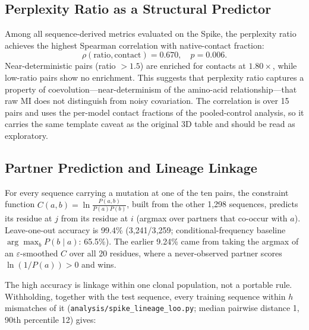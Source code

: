\subsection{Perplexity Ratio as a Structural Predictor}
Among all sequence-derived metrics evaluated on the Spike, the perplexity
ratio achieves the highest Spearman correlation with native-contact fraction:
\begin{equation}
	\rho(\text{ratio}, \text{contact}) = 0.670, \quad p = 0.006.
\end{equation}
Near-deterministic pairs (ratio $> 1.5$) are enriched for contacts at
$1.80\times$, while low-ratio pairs show no enrichment.  This suggests that
perplexity ratio captures a property of coevolution---near-determinism of the
amino-acid relationship---that raw MI does not distinguish from noisy
covariation.  The correlation is over 15 pairs and uses the per-model contact
fractions of the pooled-control analysis, so it carries the same template
caveat as the original 3D table and should be read as exploratory.

\subsection{Partner Prediction and Lineage Linkage}
For every sequence carrying a mutation at one of the ten pairs, the
constraint function $C(a,b) = \ln\frac{P(a,b)}{P(a)P(b)}$, built from the
other 1{,}298 sequences, predicts its residue at $j$ from its residue at $i$
(argmax over partners that co-occur with $a$).  Leave-one-out accuracy is
99.4\% (3{,}241/3{,}259; conditional-frequency baseline $\arg\max_b P(b\mid a)$:
65.5\%).  The earlier 9.24\% came from taking the argmax of an
$\varepsilon$-smoothed $C$ over all 20 residues, where a never-observed partner
scores $\ln(1/P(a)) > 0$ and wins.

The high accuracy is linkage within one clonal population, not a portable
rule.  Withholding, together with the test sequence, every training sequence
within $h$ mismatches of it (\texttt{analysis/spike\_lineage\_loo.py};
median pairwise distance 1, 90th percentile 12) gives:

